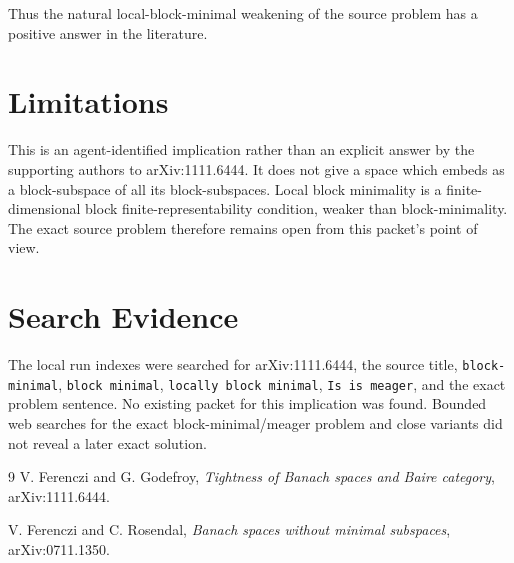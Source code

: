 \documentclass[11pt]{article}
\begin{document}
Thus the natural local-block-minimal weakening of the source problem has a
positive answer in the literature.

\section*{Limitations}

This is an agent-identified implication rather than an explicit answer by the
supporting authors to arXiv:1111.6444.  It does not give a space which embeds
as a block-subspace of all its block-subspaces.  Local block minimality is a
finite-dimensional block finite-representability condition, weaker than
block-minimality.  The exact source problem therefore remains open from this
packet's point of view.

\section*{Search Evidence}

The local run indexes were searched for arXiv:1111.6444, the source title,
\texttt{block-minimal}, \texttt{block minimal}, \texttt{locally block minimal},
\texttt{Is is meager}, and the exact problem sentence.  No existing packet for
this implication was found.  Bounded web searches for the exact
block-minimal/meager problem and close variants did not reveal a later exact
solution.

\begin{thebibliography}{9}
V. Ferenczi and G. Godefroy,
\emph{Tightness of Banach spaces and Baire category},
arXiv:1111.6444.

V. Ferenczi and C. Rosendal,
\emph{Banach spaces without minimal subspaces},
arXiv:0711.1350.
\end{thebibliography}
\end{document}
